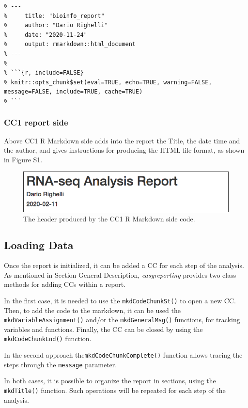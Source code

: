 \documentclass[]{article}
\begin{document}
\begin{verbatim}
% ---
%     title: "bioinfo_report"
%     author: "Dario Righelli"
%     date: "2020-11-24"
%     output: rmarkdown::html_document
% ---
% 
% ```{r, include=FALSE}
% knitr::opts_chunk$set(eval=TRUE, echo=TRUE, warning=FALSE, message=FALSE, include=TRUE, cache=TRUE)
% ```
\end{verbatim}

\hypertarget{cc1-report-side}{%
\subsubsection{CC1 report side}\label{cc1-report-side}}

Above CC1 R Markdown side adds into the report the Title, the date time
and the author, and gives instructions for producing the HTML file
format, as shown in Figure S1.

\begin{figure}
\centering
\includegraphics{imgs/1.png}
\caption{The header produced by the CC1 R Markdown side code.}
\end{figure}

\hypertarget{loading-data}{%
\subsection{Loading Data}\label{loading-data}}

Once the report is initialized, it can be added a CC for each step of
the analysis. As mentioned in Section General Description,
\emph{easyreporting} provides two class methods for adding CCs within a
report.

In the first case, it is needed to use the \texttt{mkdCodeChunkSt()} to
open a new CC. Then, to add the code to the markdown, it can be used the
\texttt{mkdVariableAssignment()} and/or the \texttt{mkdGeneralMsg()}
functions, for tracking variables and functions. Finally, the CC can be
closed by using the \texttt{mkdCodeChunkEnd()} function.

In the second approach the\texttt{mkdCodeChunkComplete()} function
allows tracing the steps through the \texttt{message} parameter.

In both cases, it is possible to organize the report in sections, using
the \texttt{mkdTitle()} function. Such operations will be repeated for
each step of the analysis.
\end{document}

